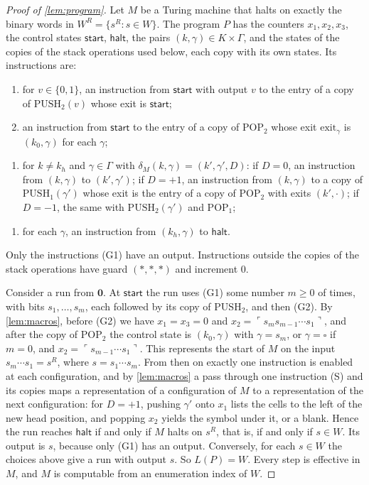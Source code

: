 \documentclass[11pt]{article}
\theoremstyle{plain}
\theoremstyle{definition}
\theoremstyle{remark}
\newcommand{\start}{\mathsf{start}}
\newcommand{\halt}{\mathsf{halt}}
\newcommand{\st}[1]{\ulcorner #1\urcorner}
\newcommand{\PUSH}{\mathrm{PUSH}}
\newcommand{\POP}{\mathrm{POP}}
\begin{document}
\begin{proof}[Proof of \cref{lem:program}]
Let $M$ be a Turing machine that halts on exactly the binary words in $W^R=\{s^R:s\in W\}$. The program $P$ has the counters $x_1,x_2,x_3$, the control states $\start$, $\halt$, the pairs $(k,\gamma)\in K\times\Gamma$, and the states of the copies of the stack operations used below, each copy with its own states. Its instructions are:
\begin{enumerate}[label=(G\arabic*)]
\item for $v\in\{0,1\}$, an instruction from $\start$ with output $v$ to the entry of a copy of $\PUSH_2(v)$ whose exit is $\start$;
\item an instruction from $\start$ to the entry of a copy of $\POP_2$ whose exit $\mathrm{exit}_\gamma$ is $(k_0,\gamma)$ for each $\gamma$;
\end{enumerate}
\begin{enumerate}[label=(S)]
\item for $k\ne k_h$ and $\gamma\in\Gamma$ with $\delta_M(k,\gamma)=(k',\gamma',D)$: if $D=0$, an instruction from $(k,\gamma)$ to $(k',\gamma')$; if $D=+1$, an instruction from $(k,\gamma)$ to a copy of $\PUSH_1(\gamma')$ whose exit is the entry of a copy of $\POP_2$ with exits $(k',\cdot)$; if $D=-1$, the same with $\PUSH_2(\gamma')$ and $\POP_1$;
\end{enumerate}
\begin{enumerate}[label=(H)]
\item for each $\gamma$, an instruction from $(k_h,\gamma)$ to $\halt$.
\end{enumerate}
Only the instructions (G1) have an output. Instructions outside the copies of the stack operations have guard $(*,*,*)$ and increment $0$.

Consider a run from $\mathbf 0$. At $\start$ the run uses (G1) some number $m\ge0$ of times, with bits $s_1,\dots,s_m$, each followed by its copy of $\PUSH_2$, and then (G2). By \cref{lem:macros}, before (G2) we have $x_1=x_3=0$ and $x_2=\st{s_m s_{m-1}\cdots s_1}$, and after the copy of $\POP_2$ the control state is $(k_0,\gamma)$ with $\gamma=s_m$, or $\gamma=\square$ if $m=0$, and $x_2=\st{s_{m-1}\cdots s_1}$. This represents the start of $M$ on the input $s_m\cdots s_1=s^R$, where $s=s_1\cdots s_m$. From then on exactly one instruction is enabled at each configuration, and by \cref{lem:macros} a pass through one instruction (S) and its copies maps a representation of a configuration of $M$ to a representation of the next configuration: for $D=+1$, pushing $\gamma'$ onto $x_1$ lists the cells to the left of the new head position, and popping $x_2$ yields the symbol under it, or a blank. Hence the run reaches $\halt$ if and only if $M$ halts on $s^R$, that is, if and only if $s\in W$. Its output is $s$, because only (G1) has an output. Conversely, for each $s\in W$ the choices above give a run with output $s$. So $L(P)=W$. Every step is effective in $M$, and $M$ is computable from an enumeration index of $W$.
\end{proof}
\end{document}
